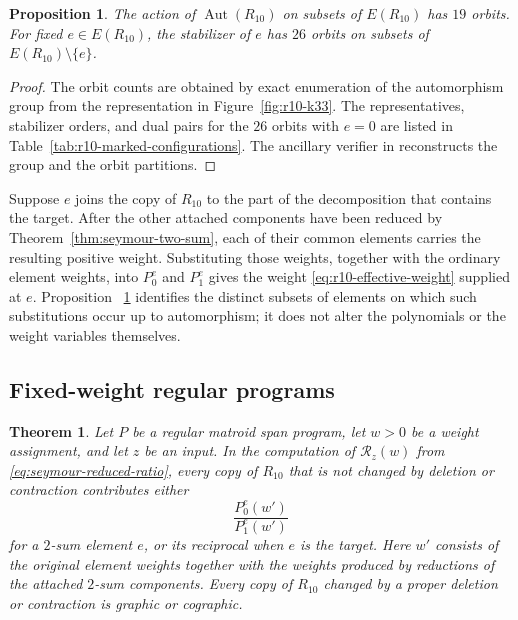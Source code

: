 \documentclass[11pt]{article}
\numberwithin{equation}{section}
\newtheorem{proposition}[definition]{Proposition}
\newtheorem{theorem}[definition]{Theorem}
\theoremstyle{remark}
\begin{document}
\begin{proposition}
\label{prop:r10-subset-orbits}
The action of $\operatorname{Aut}(R_{10})$ on subsets of $E(R_{10})$ has
$19$ orbits.  For fixed $e\in E(R_{10})$, the stabilizer of $e$ has $26$
orbits on subsets of $E(R_{10})\setminus\{e\}$.
\end{proposition}

\begin{proof}
The orbit counts are obtained by exact enumeration of the automorphism group
from the representation in Figure~\ref{fig:r10-k33}.  The representatives,
stabilizer orders, and dual pairs for the $26$ orbits with $e=0$ are listed
in Table~\ref{tab:r10-marked-configurations}.  The ancillary verifier in
 reconstructs the group and the orbit partitions.
\end{proof}

Suppose $e$ joins the copy of $R_{10}$ to the part of the decomposition that
contains the target.  After the other attached components have been reduced
by Theorem~\ref{thm:seymour-two-sum}, each of their common elements carries
the resulting positive weight.  Substituting those weights, together with
the ordinary element weights, into $P_0^e$ and $P_1^e$ gives the weight
\eqref{eq:r10-effective-weight} supplied at $e$.  Proposition
~\ref{prop:r10-subset-orbits} identifies the distinct subsets of elements on
which such substitutions occur up to automorphism; it does not alter the
polynomials or the weight variables themselves.

\subsection{Fixed-weight regular programs}
\label{subsec:r10-fixed-weight-programs}

\begin{theorem}
\label{thm:r10-fixed-weight-evaluation}
Let $P$ be a regular matroid span program, let $w>0$ be a weight assignment,
and let $z$ be an input.  In the computation of $\mathscr R_z(w)$ from
\eqref{eq:seymour-reduced-ratio}, every copy of $R_{10}$ that is not changed
by deletion or contraction contributes either
\begin{equation}
    \frac{P_0^e(w')}{P_1^e(w')}
    \label{eq:r10-parent-ratio}
\end{equation}
for a $2$-sum element $e$, or its reciprocal when $e$ is the target.  Here
$w'$ consists of the original element weights together with the weights
produced by reductions of the attached $2$-sum components.  Every copy of
$R_{10}$ changed by a proper deletion or contraction is graphic or
cographic.
\end{theorem}
\end{document}
